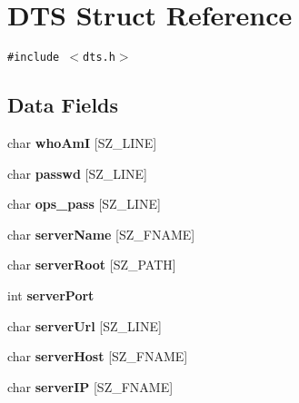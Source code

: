 \hypertarget{structDTS}{
\section{DTS Struct Reference}
\label{structDTS}
}
{\tt \#include $<$dts.h$>$}

\subsection*{Data Fields}
\begin{CompactItemize}
\item 
\hypertarget{structDTS_fd5833e9e0736c22fb04c07b0f0007de}{
char \textbf{whoAmI} \mbox{[}SZ\_\-LINE\mbox{]}}
\label{structDTS_fd5833e9e0736c22fb04c07b0f0007de}

\item 
\hypertarget{structDTS_52d7c33b9ea984627aa29215d275aa0e}{
char \textbf{passwd} \mbox{[}SZ\_\-LINE\mbox{]}}
\label{structDTS_52d7c33b9ea984627aa29215d275aa0e}

\item 
\hypertarget{structDTS_46faa7f62b5ba58d703f18cc27e717de}{
char \textbf{ops\_\-pass} \mbox{[}SZ\_\-LINE\mbox{]}}
\label{structDTS_46faa7f62b5ba58d703f18cc27e717de}

\item 
\hypertarget{structDTS_78799faa36e10e5a0c35f4cefb9263e3}{
char \textbf{serverName} \mbox{[}SZ\_\-FNAME\mbox{]}}
\label{structDTS_78799faa36e10e5a0c35f4cefb9263e3}

\item 
\hypertarget{structDTS_e906f1fb54c416a291532676433fb88e}{
char \textbf{serverRoot} \mbox{[}SZ\_\-PATH\mbox{]}}
\label{structDTS_e906f1fb54c416a291532676433fb88e}

\item 
\hypertarget{structDTS_12d76e917a56354c997a0dd63183f51c}{
int \textbf{serverPort}}
\label{structDTS_12d76e917a56354c997a0dd63183f51c}

\item 
\hypertarget{structDTS_6a6efda62e9b7257ea420e9101e095cb}{
char \textbf{serverUrl} \mbox{[}SZ\_\-LINE\mbox{]}}
\label{structDTS_6a6efda62e9b7257ea420e9101e095cb}

\item 
\hypertarget{structDTS_7b8b89bb2d1e71704cb80348586066d3}{
char \textbf{serverHost} \mbox{[}SZ\_\-FNAME\mbox{]}}
\label{structDTS_7b8b89bb2d1e71704cb80348586066d3}

\item 
\hypertarget{structDTS_a7ac501d99aad88a97c75a1d8d6cc56d}{
char \textbf{serverIP} \mbox{[}SZ\_\-FNAME\mbox{]}}
\label{structDTS_a7ac501d99aad88a97c75a1d8d6cc56d}


\end{CompactItemize}
